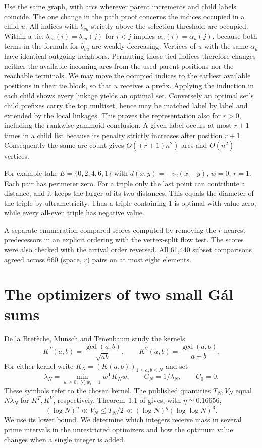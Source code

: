 \documentclass[11pt,a4paper]{article}
\begin{document}
Use the same graph, with arcs wherever parent increments and child labels
coincide. The one change in the path proof concerns the indices occupied
in a child \(u\). All indices with \(b_{vu}\) strictly above the selection
threshold are occupied. Within a tie, \(b_{vu}(i)=b_{vu}(j)\) for \(i<j\)
implies \(\alpha_u(i)=\alpha_u(j)\), because both terms in the formula
for \(b_{vu}\) are weakly decreasing. Vertices of \(u\) with the same
\(\alpha_u\) have identical outgoing neighbors. Permuting those tied
indices therefore changes neither the available incoming arcs from the
used parent positions nor the reachable terminals. We may move the
occupied indices to the earliest available positions in their tie block,
so that \(u\) receives a prefix. Applying the induction in each child
shows every linkage yields an optimal set. Conversely an optimal set's
child prefixes carry the top multiset, hence may be matched label by
label and extended by the local linkages. This proves the representation
also for \(r>0\), including the rankwise gammoid conclusion.
A given label occurs at most \(r+1\) times in a child list because its
penalty strictly increases after position \(r+1\). Consequently the
same arc count gives \(O((r+1)n^2)\) arcs and \(O(n^2)\) vertices.

For example take \(E=\{0,2,4,6,1\}\) with \(d(x,y)=-v_2(x-y)\),
\(w=0\), \(r=1\). Each pair has perimeter zero. For a triple only the last
point can contribute a distance, and it keeps the larger of its two
distances. This equals the diameter of the triple by ultrametricity.
Thus a triple containing \(1\) is optimal with value zero, while every
all-even triple has negative value.

A separate enumeration compared scores computed by removing the $r$ nearest predecessors in an explicit ordering with the vertex-split flow test. The scores were also checked with the arrival order reversed. All 61,440 subset comparisons agreed across 660 (space, $r$) pairs on at most eight elements.

\section{The optimizers of two small Gál sums}\label{sec:gal}

De la Bretèche, Munsch and Tenenbaum study the kernels
\[
 K^{T}(a,b)=\frac{\gcd(a,b)}{\sqrt{ab}},\qquad
 K^{V}(a,b)=\frac{\gcd(a,b)}{a+b}.
\]
For either kernel write $K_N=(K(a,b))_{1\le a,b\le N}$ and set
\[
 \lambda_N=\min_{w\ge0,\ \sum w_i=1}w^{\mathsf T}K_Nw,\qquad
 C_N=1/\lambda_N,\qquad C_0=0 .
\]
These symbols refer to the chosen kernel. The published quantities $T_N,V_N$ equal $N\lambda_N$ for $K^T,K^V$, respectively. Theorem~1.1 of \cite{dmtgal} gives, with $\eta\simeq0.16656$,
\[
 (\log N)^\eta\ll V_N\le T_N/2\ll
 (\log N)^\eta(\log\log N)^3.
\]
We use its lower bound. We determine which integers receive mass in several prime intervals in the unrestricted optimizers and how the optimum value changes when a single integer is added.
\end{document}
